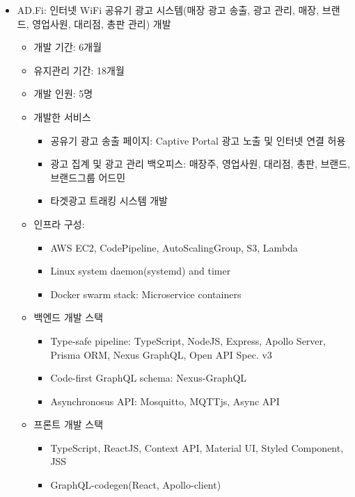 \begin{itemize}
	\item AD.Fi: 인터넷 WiFi 공유기 광고 시스템(매장 광고 송출, 광고 관리, 매장, 브랜드, 영업사원, 대리점, 총판 관리) 개발
	      \begin{itemize}[label=$\star$]
		      \item 개발 기간: 6개월
		      \item 유지관리 기간: 18개월
		      \item 개발 인원: 5명
		      \item 개발한 서비스
		            \begin{itemize}
			            \item 공유기 광고 송출 페이지: Captive Portal 광고 노출 및 인터넷 연결 허용
			            \item 광고 집계 및 광고 관리 백오피스: 매장주, 영업사원, 대리점, 총판, 브랜드, 브랜드그룹 어드민
			            \item 타겟광고 트래킹 시스템 개발
		            \end{itemize}
		      \item 인프라 구성:
		            \begin{itemize}
			            \item AWS EC2, CodePipeline, AutoScalingGroup, S3, Lambda
			            \item Linux system daemon(systemd) and timer
			            \item Docker swarm stack: Microservice containers
		            \end{itemize}
		      \item 백엔드 개발 스택
		            \begin{itemize}
			            \item Type-safe pipeline: TypeScript, NodeJS, Express, Apollo Server, Prisma ORM, Nexus GraphQL, Open API Spec. v3
			            \item Code-first GraphQL schema: Nexus-GraphQL
			            \item Asynchronosus API: Mosquitto, MQTTjs, Async API
		            \end{itemize}
		      \item 프론트 개발 스택
		            \begin{itemize}
			            \item TypeScript, ReactJS, Context API, Material UI, Styled Component, JSS
			            \item GraphQL-codegen(React, Apollo-client)

\end{itemize}
\end{itemize}
\end{itemize}
